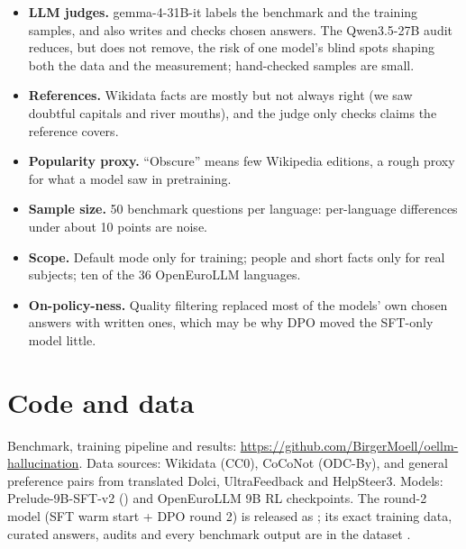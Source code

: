 \documentclass[11pt,a4paper]{article}
\begin{document}
\begin{itemize}
  \item \textbf{LLM judges.} gemma-4-31B-it labels the benchmark and the training samples, and also writes and checks chosen answers. The Qwen3.5-27B audit reduces, but does not remove, the risk of one model's blind spots shaping both the data and the measurement; hand-checked samples are small.
  \item \textbf{References.} Wikidata facts are mostly but not always right (we saw doubtful capitals and river mouths), and the judge only checks claims the reference covers.
  \item \textbf{Popularity proxy.} ``Obscure'' means few Wikipedia editions, a rough proxy for what a model saw in pretraining.
  \item \textbf{Sample size.} 50 benchmark questions per language: per-language differences under about 10 points are noise.
  \item \textbf{Scope.} Default mode only for training; people and short facts only for real subjects; ten of the 36 OpenEuroLLM languages.
  \item \textbf{On-policy-ness.} Quality filtering replaced most of the models' own chosen answers with written ones, which may be why DPO moved the SFT-only model little.
\end{itemize}

\section*{Code and data}

Benchmark, training pipeline and results: \url{https://github.com/BirgerMoell/oellm-hallucination}.
Data sources: Wikidata (CC0), CoCoNot (ODC-By), and general preference pairs from translated Dolci, UltraFeedback and HelpSteer3.
Models: Prelude-9B-SFT-v2 () and OpenEuroLLM 9B RL checkpoints.
The round-2 model (SFT warm start + DPO round 2) is released as ; its exact training data, curated answers, audits and every benchmark output are in the dataset .



\end{document}
